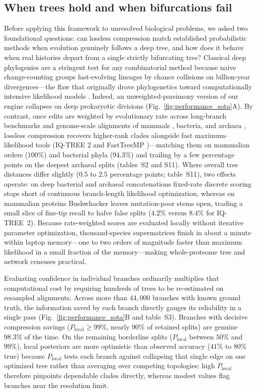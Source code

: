 \documentclass[12pt]{article}
\begin{document}
\subsection*{When trees hold and when bifurcations fail}

Before applying this framework to unresolved biological problems, we asked two foundational questions: can lossless compression match established probabilistic methods when evolution genuinely follows a deep tree, and how does it behave when real histories depart from a single strictly bifurcating tree? Classical deep phylogenies are a stringent test for any combinatorial method because naive change-counting groups fast-evolving lineages by chance collisions on billion-year divergences---the flaw that originally drove phylogenetics toward computationally intensive likelihood models \cite{felsenstein1978cases,felsenstein1981evolutionary}. Indeed, an unweighted-parsimony version of our engine collapses on deep prokaryotic divisions (Fig.~\ref{fig:performance_sota}A). By contrast, once edits are weighted by evolutionary rate across long-branch benchmarks \cite{le2008improved} and genome-scale alignments of mammals \cite{malovichko2026toga2}, bacteria, and archaea \cite{parks2020gtdb}, lossless compression recovers higher-rank clades alongside fast maximum-likelihood tools (IQ-TREE 2 \cite{minh2020iqtree} and FastTreeMP \cite{price2010fasttree})---matching them on mammalian orders ($100\%$) and bacterial phyla ($94.3\%$) and trailing by a few percentage points on the deepest archaeal splits (tables~S2 and S11). Where overall tree distances differ slightly ($0.5$ to $2.5$ percentage points; table~S11), two effects operate: on deep bacterial and archaeal concatenations fixed-rate discrete scoring stops short of continuous branch-length likelihood optimization, whereas on mammalian proteins Bushwhacker leaves mutation-poor stems open, trading a small slice of fine-tip recall to halve false splits ($4.2\%$ versus $8.4\%$ for IQ-TREE~2). Because rate-weighted scores are evaluated locally without iterative parameter optimization, thousand-species supermatrices finish in about a minute within laptop memory---one to two orders of magnitude faster than maximum likelihood in a small fraction of the memory---making whole-proteome tree and network censuses practical.

Evaluating confidence in individual branches ordinarily multiplies that computational cost by requiring hundreds of trees to be re-estimated on resampled alignments. Across more than $44,000$ branches with known ground truth, the information saved by each branch directly gauges its reliability in a single pass (Fig.~\ref{fig:performance_sota}B and table~S3). Branches with decisive compression savings ($P_{\mathrm{local}} \ge 99\%$, nearly $90\%$ of retained splits) are genuine $98.3\%$ of the time. On the remaining borderline splits ($P_{\mathrm{local}}$ between $50\%$ and $99\%$), local posteriors are more optimistic than observed accuracy ($41\%$ to $80\%$ true) because $P_{\mathrm{local}}$ tests each branch against collapsing that single edge on one optimized tree rather than averaging over competing topologies; high $P_{\mathrm{local}}$ therefore pinpoints dependable clades directly, whereas modest values flag branches near the resolution limit.
\end{document}
